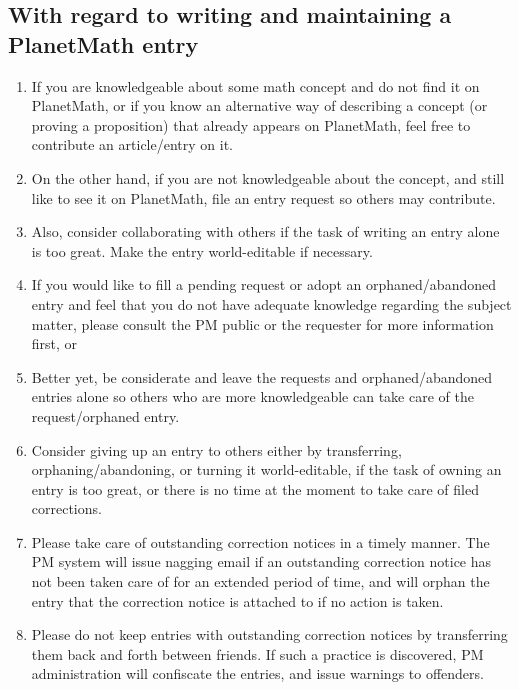 \subsection*{With regard to writing and maintaining a PlanetMath entry}
\begin{enumerate}
\item If you are knowledgeable about some math concept and do not find it on PlanetMath, or if you know an alternative way of describing a concept (or proving a proposition) that already appears on PlanetMath, feel free to contribute an article/entry on it.
\item On the other hand, if you are not knowledgeable about the concept, and still like to see it on PlanetMath, file an entry request so others may contribute.
\item Also, consider collaborating with others if the task of writing an entry alone is too great. Make the entry world-editable if necessary.
\item If you would like to fill a pending request or adopt an orphaned/abandoned entry and feel that you do not have adequate knowledge regarding the subject matter, please consult the PM public or the requester for more information first, or
\item Better yet, be considerate and leave the requests and orphaned/abandoned entries alone so others who are more knowledgeable can take care of the request/orphaned entry.
\item Consider giving up an entry to others either by transferring, orphaning/abandoning, or turning it world-editable, if the task of owning an entry is too great, or there is no time at the moment to take care of filed corrections.
\item Please take care of outstanding correction notices in a timely manner. The PM system will issue nagging email if an outstanding correction notice has not been taken care of for an extended period of time, and will orphan the entry that the correction notice is attached to if no action is taken.
\item Please do not keep entries with outstanding correction notices by transferring them back and forth between friends. If such a practice is discovered, PM administration will confiscate the entries, and issue warnings to offenders.
\end{enumerate}

